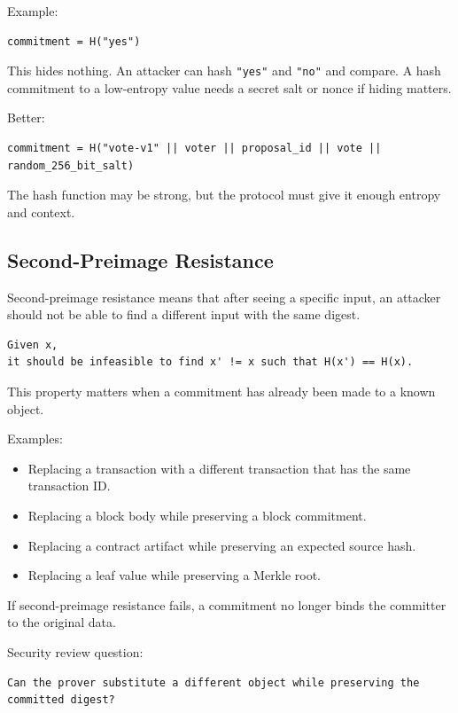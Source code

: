 Example:

\begin{lstlisting}
commitment = H("yes")
\end{lstlisting}

This hides nothing. An attacker can hash \passthrough{\lstinline!"yes"!}
and \passthrough{\lstinline!"no"!} and compare. A hash commitment to a
low-entropy value needs a secret salt or nonce if hiding matters.

Better:

\begin{lstlisting}
commitment = H("vote-v1" || voter || proposal_id || vote || random_256_bit_salt)
\end{lstlisting}

The hash function may be strong, but the protocol must give it enough
entropy and context.

\subsection{Second-Preimage Resistance}

Second-preimage resistance means that after seeing a specific input, an
attacker should not be able to find a different input with the same
digest.

\begin{lstlisting}
Given x,
it should be infeasible to find x' != x such that H(x') == H(x).
\end{lstlisting}

This property matters when a commitment has already been made to a known
object.

Examples:

\begin{itemize}
\tightlist
\item
  Replacing a transaction with a different transaction that has the same
  transaction ID.
\item
  Replacing a block body while preserving a block commitment.
\item
  Replacing a contract artifact while preserving an expected source
  hash.
\item
  Replacing a leaf value while preserving a Merkle root.
\end{itemize}

If second-preimage resistance fails, a commitment no longer binds the
committer to the original data.

Security review question:

\begin{lstlisting}
Can the prover substitute a different object while preserving the committed digest?
\end{lstlisting}

